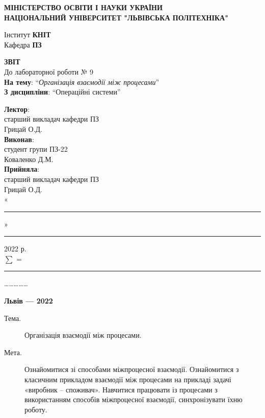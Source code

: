 \documentclass{article}
\newcommand\subject{Операційні системи}
\newcommand\lecturer{старший викладач кафедри ПЗ\\Грицай О.Д.}
\newcommand\teacher{старший викладач кафедри ПЗ\\Грицай О.Д.}
\newcommand\mygroup{ПЗ-22}
\newcommand\lab{9}
\newcommand\theme{Організація взаємодії між процесами}
\newcommand\purpose{Ознайомитися зі способами міжпроцесної взаємодії. Ознайомитися з
	класичним прикладом взаємодії між процесами на прикладі задачі «виробник –
	споживач». Навчитися працювати із процесами з використанням способів
	міжпроцесної взаємодії, синхронізувати їхню роботу}
\begin{document}
\begin{normalsize}
	\begin{titlepage}
		\thispagestyle{empty}
		\begin{center}
			\textbf{МІНІСТЕРСТВО ОСВІТИ І НАУКИ УКРАЇНИ\\
				НАЦІОНАЛЬНИЙ УНІВЕРСИТЕТ "ЛЬВІВСЬКА ПОЛІТЕХНІКА"}
		\end{center}
		\begin{flushright}
			Інститут \textbf{КНІТ}\\
			Кафедра \textbf{ПЗ}
		\end{flushright}
		\vspace{200pt}
		\begin{center}
			\textbf{ЗВІТ}\\
			\vspace{10pt}
			До лабораторної роботи № \lab\\
			\textbf{На тему}: “\textit{\theme}”\\
			\textbf{З дисципліни}: “\subject”
		\end{center}
		\vspace{112pt}
		\begin{flushright}
			
			\textbf{Лектор}:\\
			\lecturer\\
			\vspace{28pt}
			\textbf{Виконав}:\\
			
			студент групи \mygroup\\
			Коваленко Д.М.\\
			\vspace{28pt}
			\textbf{Прийняла}:\\
			
			\teacher\\
			
			\vspace{28pt}
			«\rule{1cm}{0.15mm}» \rule{1.5cm}{0.15mm} 2022 р.\\
			$\sum$ = \rule{1cm}{0.15mm}……………\\
			
		\end{flushright}
		\vspace{\fill}
		\begin{center}
			\textbf{Львів — 2022}
		\end{center}
	\end{titlepage}
		
	\begin{description}
		\item[Тема.] \theme.
		\item[Мета.] \purpose.
	\end{description}


\end{normalsize}
\end{document}
